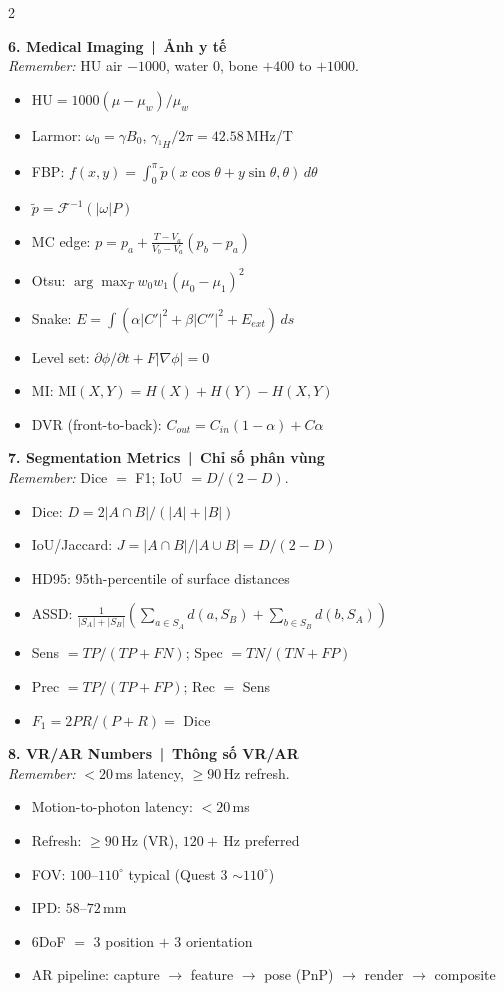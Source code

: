 \begin{multicols}{2}
\columnbreak

\textbf{6. Medical Imaging \,|\, Ảnh y tế}\\
\emph{Remember:} HU air $-1000$, water $0$, bone $+400$ to $+1000$.
\begin{itemize}
\item $\mathrm{HU}=1000(\mu-\mu_w)/\mu_w$
\item Larmor: $\omega_0=\gamma B_0$,\; $\gamma_{^1H}/2\pi=42.58$\,MHz/T
\item FBP: $f(x,y)=\int_0^{\pi}\tilde p(x\cos\theta+y\sin\theta,\theta)\,d\theta$
\item \phantom{FBP: } $\tilde p=\mathcal{F}^{-1}(|\omega|P)$
\item MC edge: $p=p_a+\tfrac{T-V_a}{V_b-V_a}(p_b-p_a)$
\item Otsu: $\arg\max_T w_0w_1(\mu_0-\mu_1)^2$
\item Snake: $E=\int(\alpha|C'|^2+\beta|C''|^2+E_{ext})\,ds$
\item Level set: $\partial\phi/\partial t+F|\nabla\phi|=0$
\item MI: $\mathrm{MI}(X,Y)=H(X)+H(Y)-H(X,Y)$
\item DVR (front-to-back): $C_{out}=C_{in}(1-\alpha)+C\alpha$
\end{itemize}

\textbf{7. Segmentation Metrics \,|\, Chỉ số phân vùng}\\
\emph{Remember:} Dice $=$ F1; IoU $= D/(2-D)$.
\begin{itemize}
\item Dice: $D=2|A\cap B|/(|A|+|B|)$
\item IoU/Jaccard: $J=|A\cap B|/|A\cup B|=D/(2-D)$
\item HD95: 95th-percentile of surface distances
\item ASSD: $\tfrac{1}{|S_A|+|S_B|}\!\left(\!\sum_{a\in S_A}\!d(a,S_B)+\!\sum_{b\in S_B}\!d(b,S_A)\!\right)$
\item Sens $=TP/(TP{+}FN)$;\; Spec $=TN/(TN{+}FP)$
\item Prec $=TP/(TP{+}FP)$;\; Rec $=$ Sens
\item $F_1=2PR/(P{+}R)=$ Dice
\end{itemize}

\textbf{8. VR/AR Numbers \,|\, Thông số VR/AR}\\
\emph{Remember:} $<20$\,ms latency, $\geq 90$\,Hz refresh.
\begin{itemize}
\item Motion-to-photon latency: $<20$\,ms
\item Refresh: $\geq 90$\,Hz (VR), $120{+}$\,Hz preferred
\item FOV: $100$--$110^{\circ}$ typical (Quest 3 $\sim 110^{\circ}$)
\item IPD: $58$--$72$\,mm
\item 6DoF $=$ 3 position $+$ 3 orientation
\item AR pipeline: capture $\to$ feature $\to$ pose (PnP) $\to$ render $\to$ composite
\end{itemize}


\end{multicols}
